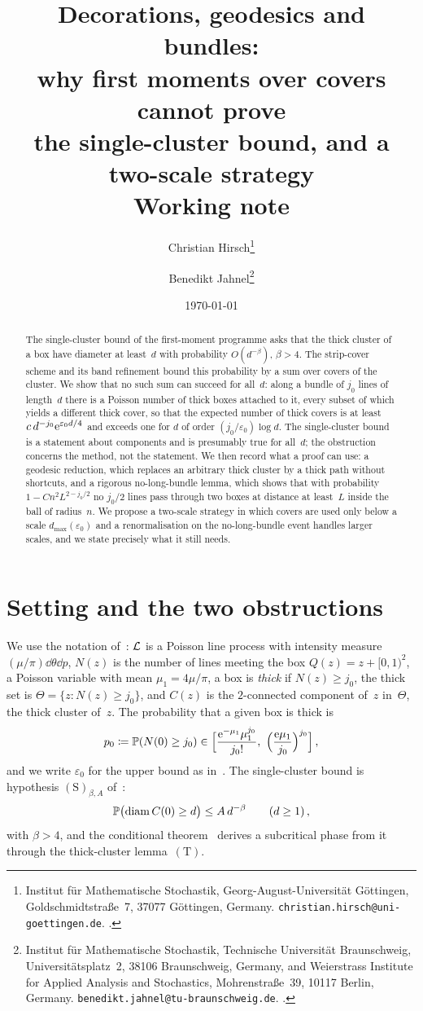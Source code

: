 \documentclass[11pt,letterpaper]{article}
\title{\textbf{Decorations, geodesics and bundles:\\ why first moments over covers cannot prove\\ the single-cluster bound, and a two-scale strategy}\\[0.6em] \large Working note}
\author{%
  Christian Hirsch\thanks{Institut f\"ur Mathematische Stochastik, Georg-August-Universit\"at G\"ottingen, Goldschmidtstra\ss e~7, 37077 G\"ottingen, Germany. \texttt{christian.hirsch@uni-goettingen.de}. \orcid{0000-0003-4136-3740}.}
  \and
  Benedikt Jahnel\thanks{Institut f\"ur Mathematische Stochastik, Technische Universit\"at Braunschweig, Universit\"atsplatz~2, 38106 Braunschweig, Germany, and Weierstrass Institute for Applied Analysis and Stochastics, Mohrenstra\ss e~39, 10117 Berlin, Germany. \texttt{benedikt.jahnel@tu-braunschweig.de}. \orcid{0000-0002-4212-0065}.}%
}
\date{\today}
\DeclareMathOperator{\diam}{diam}
\begin{document}
\maketitle
\thispagestyle{plain}

\begin{abstract}
The single-cluster bound of the first-moment programme asks that the thick cluster of a box have diameter at least~$d$ with probability $O(d^{-\beta})$, $\beta>4$. The strip-cover scheme and its band refinement bound this probability by a sum over covers of the cluster. We show that no such sum can succeed for all~$d$: along a bundle of $j_0$ lines of length~$d$ there is a Poisson number of thick boxes attached to it, every subset of which yields a different thick cover, so that the expected number of thick covers is at least $c\,d^{-j_0}\mathrm{e}^{\varepsilon_0d/4}$ and exceeds one for $d$ of order $(j_0/\varepsilon_0)\log d$. The single-cluster bound is a statement about components and is presumably true for all~$d$; the obstruction concerns the method, not the statement. We then record what a proof can use: a geodesic reduction, which replaces an arbitrary thick cluster by a thick path without shortcuts, and a rigorous no-long-bundle lemma, which shows that with probability $1-Cn^2L^{2-j_0/2}$ no $j_0/2$ lines pass through two boxes at distance at least~$L$ inside the ball of radius~$n$. We propose a two-scale strategy in which covers are used only below a scale $d_{\max}(\varepsilon_0)$ and a renormalisation on the no-long-bundle event handles larger scales, and we state precisely what it still needs.
\end{abstract}

\section{Setting and the two obstructions}
\label{sec:setting}

We use the notation of~\cite{FM26,SC26,PS26}: $\mathcal L$ is a Poisson line process with intensity measure $(\mu/\pi)\dd\theta\dd p$, $N(z)$ is the number of lines meeting the box $Q(z)=z+[0,1)^2$, a Poisson variable with mean $\mu_1=4\mu/\pi$, a box is \emph{thick} if $N(z)\ge j_0$, the thick set is $\Theta=\{z\colon N(z)\ge j_0\}$, and $C(z)$ is the $2$-connected component of~$z$ in~$\Theta$, the thick cluster of~$z$. The probability that a given box is thick is
\begin{equation}
\label{eq:eps0}
  p_0\coloneqq\P(N(0)\ge j_0)\in\Bigl[\frac{\e^{-\mu_1}\mu_1^{j_0}}{j_0!},\ \Bigl(\frac{\e\mu_1}{j_0}\Bigr)^{j_0}\Bigr]\,,
\end{equation}
and we write $\varepsilon_0$ for the upper bound as in~\cite{FM26}. The single-cluster bound is hypothesis $\mathrm{(S)}_{\beta,A}$ of~\cite[Definition~3.2]{FM26}:
\begin{equation}
\label{eq:S}
  \P\bigl(\diam C(0)\ge d\bigr)\le A\,d^{-\beta}\qquad(d\ge1)\,,
\end{equation}
with $\beta>4$, and the conditional theorem~\cite[Theorem~1.2]{FM26} derives a subcritical phase from it through the thick-cluster lemma~$\mathrm{(T)}$.
\end{document}
